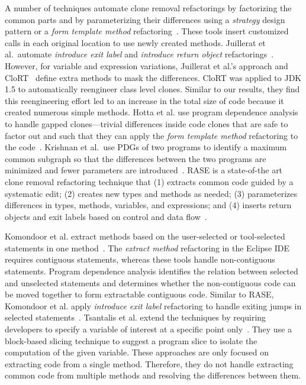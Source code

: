 \documentclass[runningheads,a4paper]{llncs}
\begin{document}
A number of techniques automate clone removal refactorings by factorizing the common parts and by parameterizing their differences using a {\em strategy} design pattern or a {\em form template method} refactoring~\cite{Balazinska1999, tairas2012increasing, juillerat2007toward, hotta2012identifying, Tsantalis2013:icsm}. These tools insert customized calls in each original location to use newly created methods. Juillerat et al.~automate {\em introduce exit label} and {\em introduce return object} refactorings~\cite{juillerat2007toward}. However, for variable and expression variations, Juillerat et al.'s approach and CloRT~\cite{Balazinska1999} define extra methods to mask the differences. CloRT was applied to JDK 1.5 to automatically reengineer class level clones. Similar to our results, they find this reengineering effort led to an increase in the total size of code because it created numerous simple methods. Hotta et al.\/ use program dependence analysis to handle gapped clones---trivial differences inside code clones that are safe to factor out and such that they can apply the {\em form template method} refactoring to the code~\cite{hotta2012identifying}. Krishnan et al.~use PDGs of two programs to identify a maximum common subgraph so that the differences between the two programs are minimized and fewer parameters are introduced~\cite{Tsantalis2013:icsm}. RASE is a state-of-the art clone removal refactoring technique that (1) extracts common code guided by a systematic  edit; (2) creates new types and methods as needed; (3) parameterizes differences in types, methods, variables, and expressions; and (4) inserts return objects and exit labels based on control and data flow~\cite{Meng2015:ARO}. 

Komondoor et al.\/ extract methods based on the user-selected or tool-selected statements in one method~\cite{Komondoor2000, Komondoor2003}. The {\em extract method} refactoring in the Eclipse IDE requires contiguous statements, whereas these tools handle non-contiguous statements. Program dependence analysis identifies the relation between selected and unselected statements and determines whether the non-contiguous code can be moved together to form extractable contiguous code. Similar to RASE, Komondoor et al.\/ apply {\em introduce exit label} refactoring to handle exiting jumps in selected statements~\cite{Komondoor2003}. Tsantalis et al.\/ extend the techniques by requiring developers to specify a variable of interest at a specific point only~\cite{tsantalis2011identification}. They use a block-based slicing technique to suggest a program slice to isolate the computation of the given variable. These approaches are only focused on extracting code from a single method. Therefore, they do not handle extracting common code from multiple methods and resolving the differences between them. 
\end{document}
